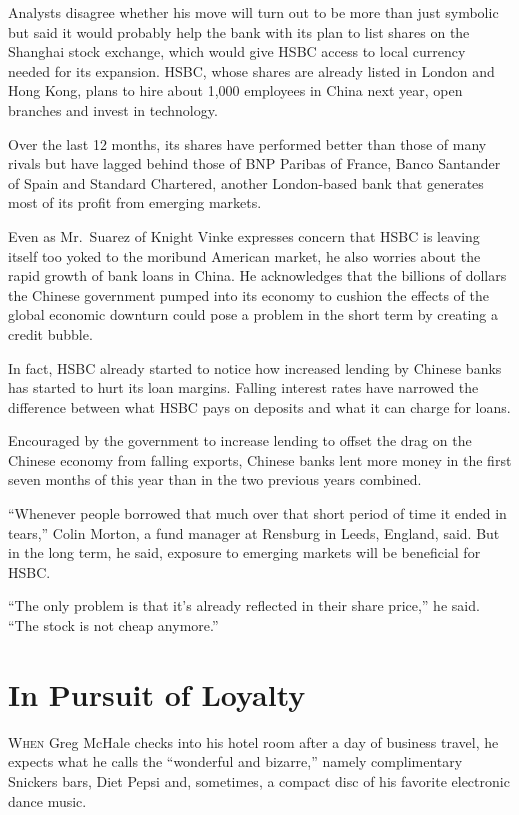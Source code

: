 ﻿\documentclass[12pt]{article}
\begin{document}
Analysts disagree whether his move will turn out to be more than just symbolic but said it would
probably help the bank with its plan to list shares on the Shanghai stock exchange, which would give
HSBC access to local currency needed for its expansion. HSBC, whose shares are already listed in
London and Hong Kong, plans to hire about 1,000 employees in China next year, open branches and
invest in technology.

Over the last 12 months, its shares have performed better than those of many rivals but have lagged
behind those of BNP Paribas of France, Banco Santander of Spain and Standard Chartered, another
London-based bank that generates most of its profit from emerging markets.

Even as Mr.~Suarez of Knight Vinke expresses concern that HSBC is leaving itself too yoked to the
moribund American market, he also worries about the rapid growth of bank loans in China. He
acknowledges that the billions of dollars the Chinese government pumped into its economy to cushion
the effects of the global economic downturn could pose a problem in the short term by creating a
credit bubble.

In fact, HSBC already started to notice how increased lending by Chinese banks has started to hurt
its loan margins. Falling interest rates have narrowed the difference between what HSBC pays on
deposits and what it can charge for loans.

Encouraged by the government to increase lending to offset the drag on the Chinese economy from
falling exports, Chinese banks lent more money in the first seven months of this year than in the
two previous years combined.

``Whenever people borrowed that much over that short period of time it ended in tears,'' Colin
Morton, a fund manager at Rensburg in Leeds, England, said. But in the long term, he said, exposure
to emerging markets will be beneficial for HSBC.

``The only problem is that it's already reflected in their share price,'' he said. ``The stock is
not cheap anymore.''

\section{In Pursuit of Loyalty}

\lettrine{W}{hen} Greg McHale checks into his hotel room after a day of
business travel, he expects what he calls the ``wonderful and bizarre,'' namely complimentary
Snickers bars, Diet Pepsi and, sometimes, a compact disc of his favorite electronic dance music.
\end{document}
